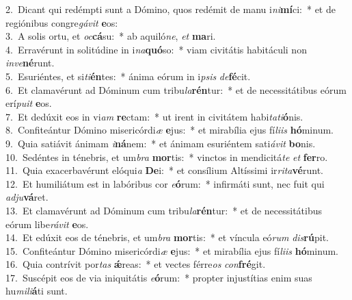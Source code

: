 {2.~}Dicant qui redémpti sunt a Dómino, quos redémit de manu i\textit{ni}\textbf{mí}ci:~* et de regiónibus congre\textit{gá}\textit{vit} \textbf{e}os:\\
{3.~}A solis ortu, et \textit{oc}\textbf{cá}su:~* ab aquiló\textit{ne}, \textit{et} \textbf{ma}ri.\\
{4.~}Erravérunt in solitúdine in i\textit{na}\textbf{quó}so:~* viam civitátis habitáculi non \textit{in}\textit{ve}\textbf{né}runt.\\
{5.~}Esuriéntes, et si\textit{ti}\textbf{én}tes:~* ánima eórum in i\textit{psis} \textit{de}\textbf{fé}cit.\\
{6.~}Et clamavérunt ad Dóminum cum tribu\textit{la}\textbf{rén}tur:~* et de necessitátibus eórum erí\textit{pu}\textit{it} \textbf{e}os.\\
{7.~}Et dedúxit eos in vi\textit{am} \textbf{re}ctam:~* ut irent in civitátem habi\textit{ta}\textit{ti}\textbf{ó}nis.\\
{8.~}Confiteántur Dómino misericórdi\textit{æ} \textbf{e}jus:~* et mirabília ejus fí\textit{li}\textit{is} \textbf{hó}minum.\\
{9.~}Quia satiávit ánimam \textit{i}\textbf{ná}nem:~* et ánimam esuriéntem sati\textit{á}\textit{vit} \textbf{bo}nis.\\
{10.~}Sedéntes in ténebris, et um\textit{bra} \textbf{mor}tis:~* vinctos in mendicitá\textit{te} \textit{et} \textbf{fer}ro.\\
{11.~}Quia exacerbavérunt elóqui\textit{a} \textbf{De}i:~* et consílium Altíssimi ir\textit{ri}\textit{ta}\textbf{vé}runt.\\
{12.~}Et humiliátum est in labóribus cor \textit{e}\textbf{ó}rum:~* infirmáti sunt, nec fuit qui \textit{ad}\textit{ju}\textbf{vá}ret.\\
{13.~}Et clamavérunt ad Dóminum cum tribu\textit{la}\textbf{rén}tur:~* et de necessitátibus eórum libe\textit{rá}\textit{vit} \textbf{e}os.\\
{14.~}Et edúxit eos de ténebris, et um\textit{bra} \textbf{mor}tis:~* et víncula eó\textit{rum} \textit{dis}\textbf{rú}pit.\\
{15.~}Confiteántur Dómino misericórdi\textit{æ} \textbf{e}jus:~* et mirabília ejus fí\textit{li}\textit{is} \textbf{hó}minum.\\
{16.~}Quia contrívit por\textit{tas} \textbf{ǽ}reas:~* et vectes férre\textit{os} \textit{con}\textbf{fré}git.\\
{17.~}Suscépit eos de via iniquitátis \textit{e}\textbf{ó}rum:~* propter injustítias enim suas hu\textit{mi}\textit{li}\textbf{á}ti sunt.\\
